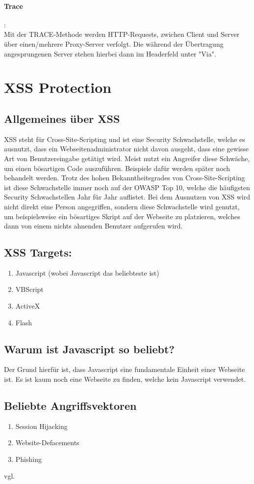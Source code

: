 \paragraph{Trace}:\\Mit der TRACE-Methode werden HTTP-Requests, zwichen Client und Server über einen/mehrere Proxy-Server verfolgt. Die während der Übertragung angesprungenen Server stehen hierbei dann im Headerfeld unter "Via".
\section{XSS Protection}
\label{sec:xss}
\subsection{Allgemeines über XSS}
\label{sec:xss_allgemein}
XSS steht für Cross-Site-Scripting und ist eine Security Schwachstelle, welche es ausnutzt, dass ein Webseitenadministrator nicht davon ausgeht, dass eine gewisse Art von Benutzereingabe getätigt wird. Meist nutzt ein Angreifer diese Schwäche, um einen bösartigen Code auszuführen. Beispiele dafür werden später noch behandelt werden. Trotz des hohen Bekanntheitsgrades von Cross-Site-Scripting ist diese Schwachstelle immer noch auf der OWASP Top 10, welche die häufigsten Security Schwachstellen Jahr für Jahr auflistet. Bei dem Ausnutzen von XSS wird nicht direkt eine Person angegriffen, sondern diese Schwachstelle wird genutzt, um beispielsweise ein bösartiges Skript auf der Webseite zu platzieren, welches dann von einem nichts ahnenden Benutzer aufgerufen wird.
\subsection{XSS Targets:}
\label{sec:xss_targets}
\begin{enumerate}
\item Javascript (wobei Javascript das beliebteste ist) 
\item VBScript 
\item ActiveX
\item Flash
\end{enumerate}
\subsection{Warum ist Javascript so beliebt?}
\label{sec:xss_why}
Der Grund hierfür ist, dass Javascript eine fundamentale Einheit einer Webseite ist. Es ist kaum noch eine Webseite zu finden, welche kein Javascript verwendet.
\subsection{Beliebte Angriffsvektoren}
\label{sec:xss_bel_agg}
\begin{enumerate}
\item Session Hijacking
\item Website-Defacements 
\item Phishing
\end{enumerate}
vgl. \textcite{XSS}
